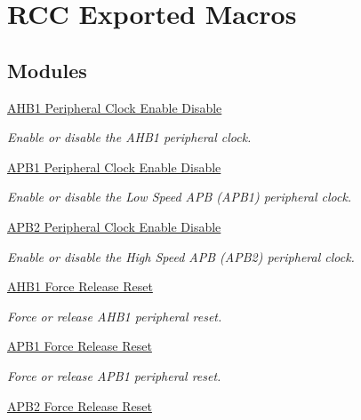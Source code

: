 \hypertarget{group___r_c_c___exported___macros}{}\section{R\+CC Exported Macros}
\label{group___r_c_c___exported___macros}
\subsection*{Modules}
\begin{DoxyCompactItemize}
\item 
\hyperlink{group___r_c_c___a_h_b1___clock___enable___disable}{A\+H\+B1 Peripheral Clock Enable Disable}
\begin{DoxyCompactList}\small\item\em Enable or disable the A\+H\+B1 peripheral clock. \end{DoxyCompactList}\item 
\hyperlink{group___r_c_c___a_p_b1___clock___enable___disable}{A\+P\+B1 Peripheral Clock Enable Disable}
\begin{DoxyCompactList}\small\item\em Enable or disable the Low Speed A\+PB (A\+P\+B1) peripheral clock. \end{DoxyCompactList}\item 
\hyperlink{group___r_c_c___a_p_b2___clock___enable___disable}{A\+P\+B2 Peripheral Clock Enable Disable}
\begin{DoxyCompactList}\small\item\em Enable or disable the High Speed A\+PB (A\+P\+B2) peripheral clock. \end{DoxyCompactList}\item 
\hyperlink{group___r_c_c___a_h_b1___force___release___reset}{A\+H\+B1 Force Release Reset}
\begin{DoxyCompactList}\small\item\em Force or release A\+H\+B1 peripheral reset. \end{DoxyCompactList}\item 
\hyperlink{group___r_c_c___a_p_b1___force___release___reset}{A\+P\+B1 Force Release Reset}
\begin{DoxyCompactList}\small\item\em Force or release A\+P\+B1 peripheral reset. \end{DoxyCompactList}\item 
\hyperlink{group___r_c_c___a_p_b2___force___release___reset}{A\+P\+B2 Force Release Reset}

\end{DoxyCompactItemize}
